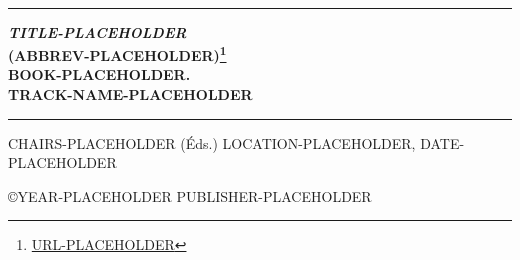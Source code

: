 \documentclass[a4paper,11pt,oneside,english]{book}
\newif\ifbackground
\newif\iflogo
\newif\ifcredits
\newif\ifsponsors
\newif\ifmessage
\newif\ifpreface
\newif\ifcommittee
\renewcommand{\headrulewidth}{0pt}
\newlength{\drop}%
\newcommand*{\plogo}{%
  \texttt{[image: logo.png]}
}
\newcommand*{\titleUL}{\begingroup%
  \drop=0.1\textheight
  \vspace*{\drop}
  \begin{center}
    {\LARGE \textsc{~~~~~}}\\[\drop]
    \iflogo
        {\LARGE \plogo}\\[2ex]
    \fi
    \rule{\textwidth}{1pt}\par
    \vspace{0.5\baselineskip}
    {\Large\bfseries \textsl{TITLE-PLACEHOLDER} \\(ABBREV-PLACEHOLDER)\footnote{\url{URL-PLACEHOLDER}}\\[2ex]
      \large BOOK-PLACEHOLDER. \\[1ex]
      \large TRACK-NAME-PLACEHOLDER}\\[2ex]
    \rule{\textwidth}{1pt}\par
    \vspace{1ex}
    \vfill
    CHAIRS-PLACEHOLDER (\'Eds.) 
    \vfill
    LOCATION-PLACEHOLDER, DATE-PLACEHOLDER \\[1ex]
  \end{center}
\endgroup}
\begin{document}
\titleUL

\renewcommand{\headrulewidth}{0pt}
\renewcommand{\footrulewidth}{0pt}

\thispagestyle{empty}

\ifbackground
\ThisULCornerWallPaper{1}{background.png}
\fi

\clearpage

\thispagestyle{empty}
\mbox{}
\vfill
\ifcredits


\fi
\large
\noindent
\copyright YEAR-PLACEHOLDER PUBLISHER-PLACEHOLDER 
\hspace*{6.5mm} \\

\clearpage

\thispagestyle{empty}

\ifsponsors
\section*{Sponsors}
\vspace*{0.5cm}

\begin{center}
\texttt{[image: sponsors.png]}
\end{center}
\fi

\clearpage

\ifmessage
\pdfbookmark{Message}{message}



\clearpage
\fi
\ifpreface
\pdfbookmark{Preface}{preface}

\section*{Preface}
\vspace*{0.5cm}



\clearpage
\fi
\ifcommittee
{}
\end{document}

